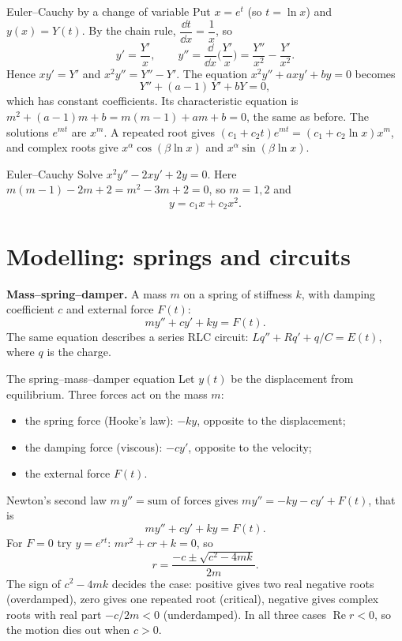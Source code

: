 \begin{derivbox}{Euler--Cauchy by a change of variable}
Put $x = e^{t}$ (so $t = \ln x$) and $y(x) = Y(t)$. By the chain rule, $\dfrac{\dd t}{\dd x} = \dfrac1x$, so
\[ y' = \frac{Y'}{x}, \qquad y'' = \frac{\dd}{\dd x}\Big(\frac{Y'}{x}\Big) = \frac{Y''}{x^2} - \frac{Y'}{x^2}. \]
Hence $xy' = Y'$ and $x^2y'' = Y'' - Y'$. The equation $x^2y'' + axy' + by = 0$ becomes
\[ Y'' + (a-1)\,Y' + bY = 0, \]
which has constant coefficients. Its characteristic equation is $m^2 + (a-1)m + b = m(m-1) + am + b = 0$, the same as before. The solutions $e^{mt}$ are $x^m$. A repeated root gives $(c_1 + c_2t)e^{mt} = (c_1 + c_2\ln x)x^m$, and complex roots give $x^\alpha\cos(\beta\ln x)$ and $x^\alpha\sin(\beta\ln x)$.
\end{derivbox}

\begin{examplebox}{Euler--Cauchy}
Solve $x^2y'' - 2xy' + 2y = 0$. Here $m(m-1) - 2m + 2 = m^2 - 3m + 2 = 0$, so $m = 1, 2$ and
\[ y = c_1x + c_2x^2. \]
\end{examplebox}

\section{Modelling: springs and circuits}

\textbf{Mass--spring--damper.} A mass $m$ on a spring of stiffness $k$, with damping coefficient $c$ and external force $F(t)$:
\[ my'' + cy' + ky = F(t). \]
The same equation describes a series RLC circuit: $Lq'' + Rq' + q/C = E(t)$, where $q$ is the charge.

\begin{derivbox}{The spring--mass--damper equation}
Let $y(t)$ be the displacement from equilibrium. Three forces act on the mass $m$:
\begin{itemize}
  \item the spring force (Hooke's law): $-ky$, opposite to the displacement;
  \item the damping force (viscous): $-cy'$, opposite to the velocity;
  \item the external force $F(t)$.
\end{itemize}
Newton's second law $m\,y'' = \text{sum of forces}$ gives $my'' = -ky - cy' + F(t)$, that is
\[ my'' + cy' + ky = F(t). \]
For $F=0$ try $y=e^{rt}$: $mr^2 + cr + k=0$, so
\[ r = \frac{-c\pm\sqrt{c^2 - 4mk}}{2m}. \]
The sign of $c^2-4mk$ decides the case: positive gives two real negative roots (overdamped), zero gives one repeated root (critical), negative gives complex roots with real part $-c/2m<0$ (underdamped). In all three cases $\operatorname{Re} r<0$, so the motion dies out when $c>0$.
\end{derivbox}

